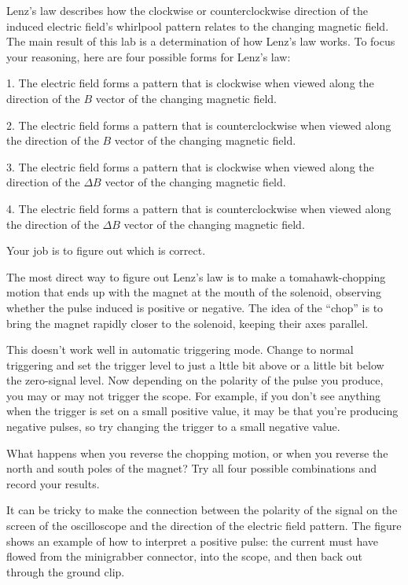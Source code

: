 Lenz's law describes how the clockwise or counterclockwise
direction of the induced electric field's whirl\-pool pattern
relates to the changing magnetic field. The main result of
this lab is a determination of how Lenz's law works. To
focus your reasoning, here are four possible forms for Lenz's law:

1. The electric field forms a pattern that is clockwise when
viewed along the direction of the $B$ vector of the
changing magnetic field.

2. The electric field forms a pattern that is counterclockwise
when viewed along the direction of the $B$ vector of the
changing magnetic field.

3. The electric field forms a pattern that is clockwise when
viewed along the direction of the $\Delta B$ vector of the
changing magnetic field.

4. The electric field forms a pattern that is counterclockwise
when viewed along the direction of the $\Delta B$ vector of
the changing magnetic field.

Your job is to figure out which is correct.

The most direct way to figure out Lenz's law is to 
make a tomahawk-chopping motion that ends up with the magnet at the mouth of the solenoid,
observing whether the pulse induced is positive or negative.
The idea of the ``chop'' is to bring the magnet rapidly closer
to the solenoid, keeping their axes parallel.

This doesn't work well in automatic triggering mode. Change to normal
triggering and set the trigger level to just a lttle bit above or a little
bit below the zero-signal level. Now depending on the polarity of the
pulse you produce, you may or may not trigger the scope. For example,
if you don't see anything when the trigger is set on a small positive
value, it may be that you're producing negative pulses, so try changing
the trigger to a small negative value.

What happens when you reverse the
chopping motion, or when you reverse the north and south
poles of the magnet? Try all four possible combinations and
record your results.


It can be tricky to make the connection between the polarity
of the signal on the screen of the oscilloscope and the
direction of the electric field pattern. The figure shows an
example of how to interpret a positive pulse: the current
must have flowed from the minigrabber connector, into the
scope, and then back out through the ground clip.




